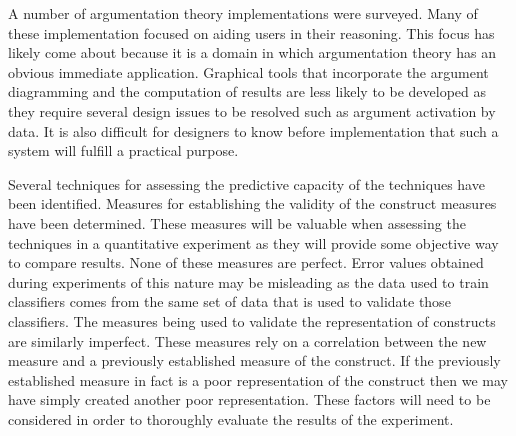 A number of argumentation theory implementations were surveyed. Many of these implementation focused on aiding users in their reasoning. This focus has likely come about because it is a domain in which argumentation theory has an obvious immediate application. Graphical tools that incorporate the argument diagramming and the computation of results are less likely to be developed as they require several design issues to be resolved such as argument activation by data. It is also difficult for designers to know before implementation that such a system will fulfill a practical purpose.

Several techniques for assessing the predictive capacity of the techniques have been identified. Measures for establishing the validity of the construct measures have been determined. These measures will be valuable when assessing the techniques in a quantitative experiment as they will provide some objective way to compare results. None of these measures are perfect. Error values obtained during experiments of this nature may be misleading as the data used to train classifiers comes from the same set of data that is used to validate those classifiers. The measures being used to validate the representation of constructs are similarly imperfect. These measures rely on a correlation between the new measure and a previously established measure of the construct. If the previously established measure in fact is a poor representation of the construct then we may have simply created another poor representation. These factors will need to be considered in order to thoroughly evaluate the results of the experiment.